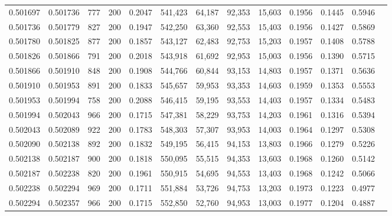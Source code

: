 \begin{tabular}{rrrrrrrrrrrrr}
0.501697 & 0.501736 &   777 & 200 &                                     0.2047 & 541,423 &  64,187 &  92,353 &  15,603 & 0.1956 & 0.1445 & 0.5946 \\
0.501736 & 0.501779 &   827 & 200 &                                     0.1947 & 542,250 &  63,360 &  92,553 &  15,403 & 0.1956 & 0.1427 & 0.5869 \\
0.501780 & 0.501825 &   877 & 200 &                                     0.1857 & 543,127 &  62,483 &  92,753 &  15,203 & 0.1957 & 0.1408 & 0.5788 \\
0.501826 & 0.501866 &   791 & 200 &                                     0.2018 & 543,918 &  61,692 &  92,953 &  15,003 & 0.1956 & 0.1390 & 0.5715 \\
0.501866 & 0.501910 &   848 & 200 &                                     0.1908 & 544,766 &  60,844 &  93,153 &  14,803 & 0.1957 & 0.1371 & 0.5636 \\
0.501910 & 0.501953 &   891 & 200 &                                     0.1833 & 545,657 &  59,953 &  93,353 &  14,603 & 0.1959 & 0.1353 & 0.5553 \\
0.501953 & 0.501994 &   758 & 200 &                                     0.2088 & 546,415 &  59,195 &  93,553 &  14,403 & 0.1957 & 0.1334 & 0.5483 \\
0.501994 & 0.502043 &   966 & 200 &                                     0.1715 & 547,381 &  58,229 &  93,753 &  14,203 & 0.1961 & 0.1316 & 0.5394 \\
0.502043 & 0.502089 &   922 & 200 &                                     0.1783 & 548,303 &  57,307 &  93,953 &  14,003 & 0.1964 & 0.1297 & 0.5308 \\
0.502090 & 0.502138 &   892 & 200 &                                     0.1832 & 549,195 &  56,415 &  94,153 &  13,803 & 0.1966 & 0.1279 & 0.5226 \\
0.502138 & 0.502187 &   900 & 200 &                                     0.1818 & 550,095 &  55,515 &  94,353 &  13,603 & 0.1968 & 0.1260 & 0.5142 \\
0.502187 & 0.502238 &   820 & 200 &                                     0.1961 & 550,915 &  54,695 &  94,553 &  13,403 & 0.1968 & 0.1242 & 0.5066 \\
0.502238 & 0.502294 &   969 & 200 &                                     0.1711 & 551,884 &  53,726 &  94,753 &  13,203 & 0.1973 & 0.1223 & 0.4977 \\
0.502294 & 0.502357 &   966 & 200 &                                     0.1715 & 552,850 &  52,760 &  94,953 &  13,003 & 0.1977 & 0.1204 & 0.4887 \\

\end{tabular}
